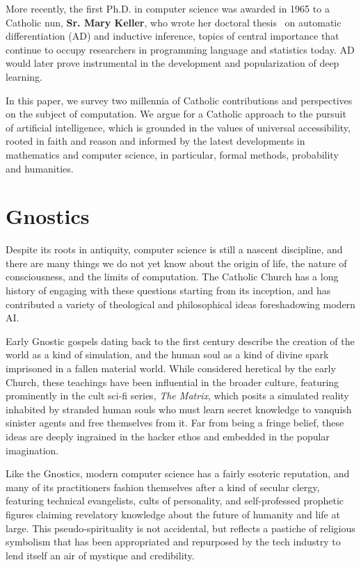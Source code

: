 \documentclass[sigplan,nonacm]{acmart}\settopmatter{printfolios=false,printccs=false,printacmref=false}
\begin{document}
  More recently, the first Ph.D. in computer science was awarded in 1965 to a Catholic nun, \textbf{Sr. Mary Keller}, who wrote her doctoral thesis~\cite{keller1965inductive} on automatic differentiation (AD) and inductive inference, topics of central importance that continue to occupy researchers in programming language and statistics today. AD would later prove instrumental in the development and popularization of deep learning.

  In this paper, we survey two millennia of Catholic contributions and perspectives on the subject of computation. We argue for a Catholic approach to the pursuit of artificial intelligence, which is grounded in the values of universal accessibility, rooted in faith and reason and informed by the latest developments in mathematics and computer science, in particular, formal methods, probability and humanities.

 \section{Gnostics}

  Despite its roots in antiquity, computer science is still a nascent discipline, and there are many things we do not yet know about the origin of life, the nature of consciousness, and the limits of computation. The Catholic Church has a long history of engaging with these questions starting from its inception, and has contributed a variety of theological and philosophical ideas foreshadowing modern AI.

  Early Gnostic gospels dating back to the first century describe the creation of the world as a kind of simulation, and the human soul as a kind of divine spark imprisoned in a fallen material world. While considered heretical by the early Church, these teachings have been influential in the broader culture, featuring prominently in the cult sci-fi series, \textit{The Matrix}, which posits a simulated reality inhabited by stranded human souls who must learn secret knowledge to vanquish sinister agents and free themselves from it. Far from being a fringe belief, these ideas are deeply ingrained in the hacker ethos and embedded in the popular imagination.

  Like the Gnostics, modern computer science has a fairly esoteric reputation, and many of its practitioners fashion themselves after a kind of secular clergy, featuring technical evangelists, cults of personality, and self-professed prophetic figures claiming revelatory knowledge about the future of humanity and life at large. This pseudo-spirituality is not accidental, but reflects a pastiche of religious symbolism that has been appropriated and repurposed by the tech industry to lend itself an air of mystique and credibility.
\end{document}
